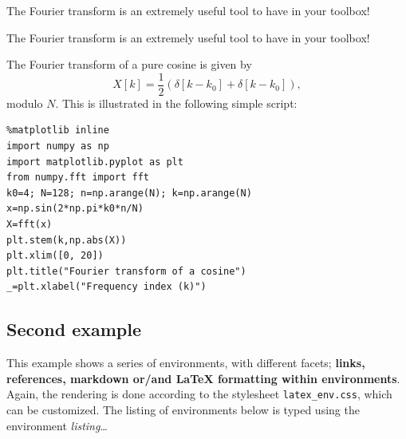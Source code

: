 \begin{listing}
\begin{textboxa}
The Fourier transform is an extremely useful tool to have in your toolbox!
\end{textboxa}
\end{listing}

    \begin{textboxa}
The Fourier transform is an extremely useful tool to have in your toolbox!
\end{textboxa}

    The Fourier transform of a pure cosine is given by \begin{equation}
X[k] = \frac{1}{2} \left( \delta[k-k_0] + \delta[k-k_0] \right), 
\end{equation} modulo $N$. This is illustrated in the following simple script:
\begin{lstlisting}
%matplotlib inline
import numpy as np
import matplotlib.pyplot as plt 
from numpy.fft import fft
k0=4; N=128; n=np.arange(N); k=np.arange(N)
x=np.sin(2*np.pi*k0*n/N)
X=fft(x)
plt.stem(k,np.abs(X))
plt.xlim([0, 20])
plt.title("Fourier transform of a cosine")
_=plt.xlabel("Frequency index (k)")
\end{lstlisting}%
%
    \begin{center}
    \end{center}
    
    \subsection{Second example}\label{second-example}

    This example shows a series of environments, with different facets;
\textbf{links, references, markdown or/and LaTeX formatting within
environments}. Again, the rendering is done according to the stylesheet
\texttt{latex\_env.css}, which can be customized. The listing of
environments below is typed using the environment \emph{listing}\ldots{}

